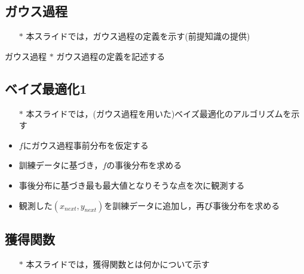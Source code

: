 \documentclass[dvipdfmx, 10.5pt]{beamer}
\begin{document}

\subsection{ガウス過程}
\begin{frame}{\insertsubsection}
	\begin{itemize}
		\item[$\ast$] 本スライドでは，ガウス過程の定義を示す(前提知識の提供)
	\end{itemize}
	\begin{block}{ガウス過程}
		$\ast$ ガウス過程の定義を記述する
	\end{block}
\end{frame}



\subsection{ベイズ最適化1}
\begin{frame}{\insertsubsection}
	\begin{itemize}
		\item[$\ast$] 本スライドでは，(ガウス過程を用いた)ベイズ最適化のアルゴリズムを示す
		\item $f$にガウス過程事前分布を仮定する
		\item 訓練データに基づき，$f$の事後分布を求める
		\item 事後分布に基づき\alert{最も最大値となりそうな点}を次に観測する
		\item 観測した$(x_{next}, y_{next})$を訓練データに追加し，再び事後分布を求める
	\end{itemize}

\end{frame}



\subsection{獲得関数}
\begin{frame}{\insertsubsection}
	\begin{itemize}
		\item[$\ast$] 本スライドでは，獲得関数とは何かについて示す
	\end{itemize}

\end{frame}

\end{document}
